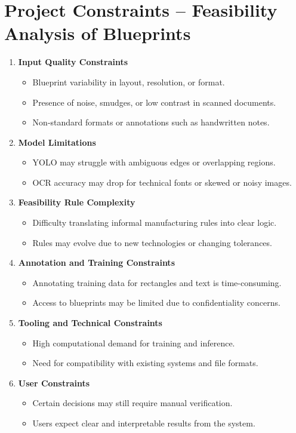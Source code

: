 \documentclass{article}
\begin{document}
\section*{Project Constraints – Feasibility Analysis of Blueprints}

\begin{enumerate}
    \item \textbf{Input Quality Constraints}
    \begin{itemize}
        \item Blueprint variability in layout, resolution, or format.
        \item Presence of noise, smudges, or low contrast in scanned documents.
        \item Non-standard formats or annotations such as handwritten notes.
    \end{itemize}

    \item \textbf{Model Limitations}
    \begin{itemize}
        \item YOLO may struggle with ambiguous edges or overlapping regions.
        \item OCR accuracy may drop for technical fonts or skewed or noisy images.
    \end{itemize}

    \item \textbf{Feasibility Rule Complexity}
    \begin{itemize}
        \item Difficulty translating informal manufacturing rules into clear logic.
        \item Rules may evolve due to new technologies or changing tolerances.
    \end{itemize}

    \item \textbf{Annotation and Training Constraints}
    \begin{itemize}
        \item Annotating training data for rectangles and text is time-consuming.
        \item Access to blueprints may be limited due to confidentiality concerns.
    \end{itemize}

    \item \textbf{Tooling and Technical Constraints}
    \begin{itemize}
        \item High computational demand for training and inference.
        \item Need for compatibility with existing systems and file formats.
    \end{itemize}

    \item \textbf{User Constraints}
    \begin{itemize}
        \item Certain decisions may still require manual verification.
        \item Users expect clear and interpretable results from the system.
    \end{itemize}
\end{enumerate}
\end{document}
